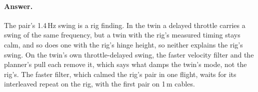 

\paragraph{Answer.} The pair's 1.4\,Hz swing is a rig finding. In the twin a delayed throttle carries a swing of the
same frequency, but a twin with the rig's measured timing stays calm, and so does one with the rig's hinge height, so
neither explains the rig's swing. On the twin's own throttle-delayed swing, the faster velocity filter and the
planner's pull each remove it, which says what damps the twin's mode, not the rig's. The faster filter, which calmed
the rig's pair in one flight, waits for its interleaved repeat on the rig, with the first pair on 1\,m cables.
